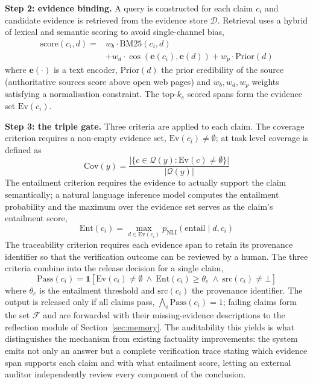 \documentclass[journal,10pt,a4paper]{IEEEtran}
\begin{document}
\textbf{Step 2: evidence binding.} A query is constructed for each claim $c_i$ and candidate evidence is retrieved from the evidence store $\mathcal{D}$. Retrieval uses a hybrid of lexical and semantic scoring to avoid single-channel bias,
\begin{equation}
\begin{split}
\mathrm{score}(c_i,d)={}&w_b\cdot\mathrm{BM25}(c_i,d)\\
&+w_d\cdot\cos(\mathbf{e}(c_i),\mathbf{e}(d))+w_p\cdot\mathrm{Prior}(d)
\end{split}
\end{equation}
where $\mathbf{e}(\cdot)$ is a text encoder, $\mathrm{Prior}(d)$ the prior credibility of the source (authoritative sources score above open web pages) and $w_b,w_d,w_p$ weights satisfying a normalisation constraint. The top-$k_e$ scored spans form the evidence set $\mathrm{Ev}(c_i)$.

\textbf{Step 3: the triple gate.} Three criteria are applied to each claim. The coverage criterion requires a non-empty evidence set, $\mathrm{Ev}(c_i)\neq\emptyset$; at task level coverage is defined as
\begin{equation}
\mathrm{Cov}(y)=\frac{\lvert\{c\in\mathcal{Q}(y):\mathrm{Ev}(c)\neq\emptyset\}\rvert}{\lvert\mathcal{Q}(y)\rvert}
\end{equation}
The entailment criterion requires the evidence to actually support the claim semantically; a natural language inference model computes the entailment probability and the maximum over the evidence set serves as the claim's entailment score,
\begin{equation}
\mathrm{Ent}(c_i)=\max_{d\in\mathrm{Ev}(c_i)}p_{\mathrm{NLI}}(\mathrm{entail}\mid d,c_i)
\end{equation}
The traceability criterion requires each evidence span to retain its provenance identifier so that the verification outcome can be reviewed by a human. The three criteria combine into the release decision for a single claim,
\begin{equation}
\mathrm{Pass}(c_i)=\mathbf{1}\!\left[\mathrm{Ev}(c_i)\neq\emptyset\ \wedge\ \mathrm{Ent}(c_i)\ge\theta_e\ \wedge\ \mathrm{src}(c_i)\neq\bot\right]
\end{equation}
where $\theta_e$ is the entailment threshold and $\mathrm{src}(c_i)$ the provenance identifier. The output is released only if all claims pass, $\bigwedge_i \mathrm{Pass}(c_i)=1$; failing claims form the set $\mathcal{F}$ and are forwarded with their missing-evidence descriptions to the reflection module of Section~\ref{sec:memory}. The auditability this yields is what distinguishes the mechanism from existing factuality improvements: the system emits not only an answer but a complete verification trace stating which evidence span supports each claim and with what entailment score, letting an external auditor independently review every component of the conclusion.
\end{document}

